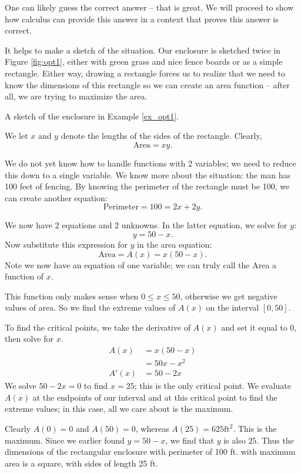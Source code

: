 {One can likely guess the correct answer -- that is great. We will proceed to show how calculus can provide this answer in a context that proves this answer is correct.

It helps to make a sketch of the situation. Our enclosure is sketched twice in Figure \ref{fig:opt1}, either with green grass and nice fence boards or as a simple rectangle. Either way, drawing a rectangle forces us to realize that we need to know the dimensions of this rectangle so we can create an area function -- after all, we are trying to maximize the area.

{\noindent\begin{center}
\captionsetup{type=figure}%
\caption{A sketch of the enclosure in Example \ref{ex_opt1}.}\label{fig:opt1}
\end{center}
} %
{
} %


We let $x$ and $y$ denote the lengths of the sides of the rectangle. Clearly, $$\text{Area}=xy.$$

We do not yet know how to handle functions with 2 variables; we need to reduce this down to a single variable. We know more about the situation: the man has 100 feet of fencing. By knowing the perimeter of the rectangle must be 100, we can create another equation: $$\text{Perimeter} = 100 = 2x+2y.$$

We now have 2 equations and 2 unknowns. In the latter equation, we solve for $y$:
$$y = 50-x.$$ Now substitute this expression for $y$ in the area equation:
$$ \text{Area} = A(x) = x(50-x).$$ Note we now have an equation of one variable; we can truly call the Area a function of $x$. 

This function only makes sense when $0\leq x \leq 50$, otherwise we get negative values of area. So we find the extreme values of $A(x)$ on the interval $[0,50]$. 

To find the critical points, we take the derivative of $A(x)$ and set it equal to 0, then solve for $x$.
\begin{align*}
A(x) &= x(50-x) \\
			&= 50x-x^2 \\
A'(x) 	&= 50-2x
\end{align*}
We solve $50-2x=0$ to find $x=25$; this is the only critical point. We evaluate $A(x)$ at the endpoints of our interval and at this critical point to find the extreme values; in this case, all we care about is the maximum.

Clearly $A(0)=0$ and $A(50)=0$, whereas $A(25) = 625 \text{ft}^2$. This is the maximum. Since we earlier found $y = 50-x$, we find that $y$ is also $25$. Thus the dimensions of the rectangular enclosure with perimeter of 100 ft. with maximum area is a square, with sides of length 25 ft.
}\\

